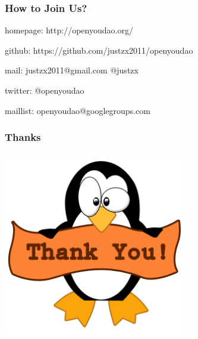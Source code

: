 \documentclass[10pt]{beamer}
\begin{document}
\begin{CJK*}{UTF8}{song}
\begin{frame}
\end{frame}

\begin{frame}
  \frametitle{How to Join Us?}

\begin{itemize}
\Large{
  \item homepage: http://openyoudao.org/
  \item github:
   https://github.com/justzx2011/openyoudao
  \item mail: justzx2011@gmail.com  @justzx
  \item twitter: @openyoudao
  \item maillist: openyoudao@googlegroups.com
}
  
\end{itemize}

\end{frame}

\begin{frame}
  \frametitle{Thanks}
\begin{center} 
  \includegraphics[width=0.6\textwidth]{thanks.png}
\end{center}
\end{frame}

\end{CJK*}
\end{document}
